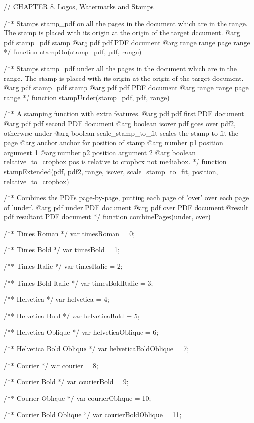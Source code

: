 // CHAPTER 8. Logos, Watermarks and Stamps
   
/** Stamps stamp_pdf on all the pages in the document which are in the
range. The stamp is placed with its origin at the origin of the target
document.
@arg {pdf} stamp_pdf stamp
@arg {pdf} pdf PDF document
@arg {range} range page range */
function stampOn(stamp_pdf, pdf, range) {}

/** Stamps stamp_pdf under all the pages in the document which are in the
range. The stamp is placed with its origin at the origin of the target
document.
@arg {pdf} stamp_pdf stamp
@arg {pdf} pdf PDF document
@arg {range} range page range */
function stampUnder(stamp_pdf, pdf, range) {}

/** A stamping function with extra features. 
@arg {pdf} pdf first PDF document
@arg {pdf} pdf second PDF document
@arg {boolean} isover pdf goes over pdf2, otherwise under
@arg {boolean} scale_stamp_to_fit scales the stamp to fit the page
@arg {anchor} anchor for position of stamp
@arg {number} p1 position argument 1
@arg {number} p2 position argument 2
@arg {boolean} relative_to_cropbox pos is relative to cropbox not mediabox. */
function stampExtended(pdf, pdf2, range, isover, scale_stamp_to_fit, position, relative_to_cropbox) {}

/** Combines the PDFs page-by-page, putting each page of 'over' over each page
of 'under'.
@arg {pdf} under PDF document
@arg {pdf} over PDF document
@result {pdf} resultant PDF document */
function combinePages(under, over) {}

/** Times Roman */
var timesRoman = 0;

/** Times Bold */
var timesBold = 1;

/** Times Italic */
var timesItalic = 2;

/** Times Bold Italic */
var timesBoldItalic = 3;

/** Helvetica */
var helvetica = 4;

/** Helvetica Bold */
var helveticaBold = 5;

/** Helvetica Oblique */
var helveticaOblique = 6;

/** Helvetica Bold Oblique */
var helveticaBoldOblique = 7;

/** Courier */
var courier = 8;

/** Courier Bold */
var courierBold = 9;

/** Courier Oblique */
var courierOblique = 10;

/** Courier Bold Oblique */
var courierBoldOblique = 11;


